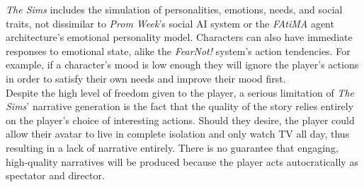 \documentclass{sig-alternate-05-2015}
\begin{document}
\textit{The Sims} includes the simulation of personalities, emotions, needs, and social traits, not dissimilar to \textit{Prom Week}'s social AI system or the \textit{FAtiMA} agent architecture's emotional personality model. Characters can also have immediate responses to emotional state, alike the \textit{FearNot!} system's action tendencies. For example, if a character's mood is low enough they will ignore the player's actions in order to satisfy their own needs and improve their mood first.\\

Despite the high level of freedom given to the player, a serious limitation of \textit{The Sims}' narrative generation is the fact that the quality of the story relies entirely on the player's choice of interesting actions. Should they desire, the player could allow their avatar to live in complete isolation and only watch TV all day, thus resulting in a lack of narrative entirely. There is no guarantee that engaging, high-quality narratives will be produced because the player acts autocratically as spectator and director.
\end{document}
